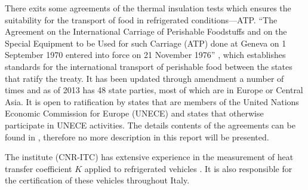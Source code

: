 There exits some agreements of the thermal insulation tests which ensures the suitability for the transport of food in refrigerated conditions---ATP.
``The Agreement on the International Carriage of Perishable Foodstuffs and on the Special Equipment to be Used for such Carriage (ATP) done at Geneva on 1 September 1970 entered into force on 21 November 1976'' \citep{Geneva1970}, which establishes standards for the international transport of perishable food between the states that ratify the treaty. It has been updated through amendment a number of times and as of 2013 has 48 state parties, most of which are in Europe or Central Asia. It is open to ratification by states that are members of the United Nations Economic Commission for Europe (UNECE) and states that otherwise participate in UNECE activities\citep{ATP_wiki}.
The details contents of the agreements can be found in \citep{ATP_wiki, rossi2009k}, therefore no more description in this report will be presented.

The institute (CNR-ITC) has extensive experience in the measurement of heat transfer coefficient $K$ applied to refrigerated vehicles \citep{rossi2009k,bison1993automatic,bison2012geometrical,dragano2009experimental,grinzato2010r}. It is also responsible for the certification of these vehicles throughout Italy.

